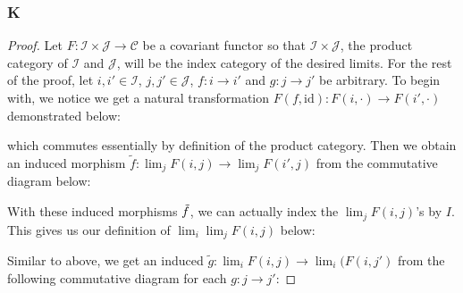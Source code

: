 \documentclass{article}
\newcommand{\id}{\mathrm{id}}
\newcommand{\fC}{\mathscr{C}}
\newcommand{\fI}{\mathscr{I}}
\newcommand{\fJ}{\mathscr{J}}
\begin{document}
\subsubsection{K}\label{1.6.K}
\begin{proof}
    Let $F:\fI\times \fJ\to \fC$ be a covariant functor so that $\fI\times \fJ$, the product category of $\fI$ and $\fJ$, will be the index category of the desired limits. For the rest of the proof, let $i,i'\in \fI$, $j,j'\in \fJ$, $f:i\to i'$ and $g:j\to j'$ be arbitrary. To begin with, we notice we get a natural transformation $F(f,\id):F(i,\cdot)\to F(i',\cdot)$ demonstrated below:
    \begin{center}
    \end{center}
    which commutes essentially by definition of the product category. Then we obtain an induced morphism $\tilde f:\lim_j F(i,j)\to \lim_j F(i',j)$ from the commutative diagram below:
    \begin{center}
    \end{center}
    With these induced morphisms $\Tilde{f}$, we can actually index the $\lim_j F(i,j)$'s by $I$. This gives us our definition of $\lim_i \lim_j F(i,j)$ below:
    \begin{center}
    \end{center}
    Similar to above, we get an induced $\tilde g:\lim_i F(i,j)\to \lim_i(F(i,j')$ from the following commutative diagram for each $g:j\to j'$:

\end{proof}
\end{document}
